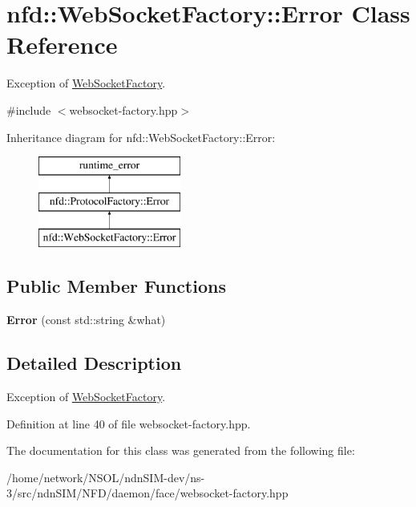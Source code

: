 \hypertarget{classnfd_1_1WebSocketFactory_1_1Error}{}\section{nfd\+:\+:Web\+Socket\+Factory\+:\+:Error Class Reference}
\label{classnfd_1_1WebSocketFactory_1_1Error}


Exception of \hyperlink{classnfd_1_1WebSocketFactory}{Web\+Socket\+Factory}.  




{\ttfamily \#include $<$websocket-\/factory.\+hpp$>$}

Inheritance diagram for nfd\+:\+:Web\+Socket\+Factory\+:\+:Error\+:\begin{figure}[H]
\begin{center}
\leavevmode
\includegraphics[height=3.000000cm]{classnfd_1_1WebSocketFactory_1_1Error}
\end{center}
\end{figure}
\subsection*{Public Member Functions}
\begin{DoxyCompactItemize}
\item 
{\bfseries Error} (const std\+::string \&what)\hypertarget{classnfd_1_1WebSocketFactory_1_1Error_a1cf19f92195944f6f6da28454fc0da60}{}\label{classnfd_1_1WebSocketFactory_1_1Error_a1cf19f92195944f6f6da28454fc0da60}

\end{DoxyCompactItemize}


\subsection{Detailed Description}
Exception of \hyperlink{classnfd_1_1WebSocketFactory}{Web\+Socket\+Factory}. 

Definition at line 40 of file websocket-\/factory.\+hpp.



The documentation for this class was generated from the following file\+:\begin{DoxyCompactItemize}
\item 
/home/network/\+N\+S\+O\+L/ndn\+S\+I\+M-\/dev/ns-\/3/src/ndn\+S\+I\+M/\+N\+F\+D/daemon/face/websocket-\/factory.\+hpp\end{DoxyCompactItemize}
